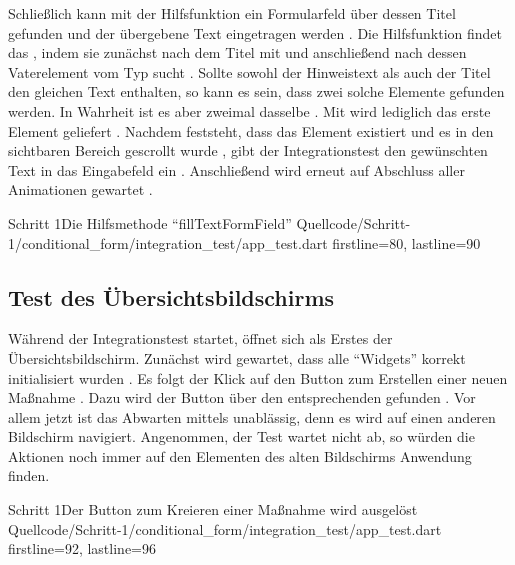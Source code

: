 Schließlich kann mit der Hilfsfunktion  ein Formularfeld über dessen Titel gefunden und der übergebene Text eingetragen werden \Lst{\ref{lst:Schritt1HilfsmethodeFillTextFormField}}.
Die Hilfsfunktion findet das ,
indem sie zunächst nach dem Titel mit  und anschließend nach dessen Vaterelement vom Typ  sucht .
Sollte sowohl der Hinweistext als auch der Titel den gleichen Text enthalten,
so kann es sein, dass zwei solche Elemente gefunden werden.
In Wahrheit ist es aber zweimal dasselbe .
Mit  wird lediglich das erste Element geliefert .
Nachdem feststeht, dass das Element existiert  und es in den sichtbaren Bereich gescrollt wurde , gibt der Integrationstest den gewünschten Text in das Eingabefeld ein .
Anschließend wird erneut auf Abschluss aller Animationen gewartet .

\begin{alexlisting}{Schritt 1}{Die Hilfsmethode \enquote{fillTextFormField}}
  {Quellcode/Schritt-1/conditional_form/integration_test/app_test.dart}
  {firstline=80, lastline=90}
  \label{lst:Schritt1HilfsmethodeFillTextFormField}
\end{alexlisting}

\subsection{Test des Übersichtsbildschirms}
\label{sec:TestDesUebersichtsbildschirms}

Während der Integrationstest startet, öffnet sich als Erstes der Übersichtsbildschirm.
Zunächst wird gewartet, dass alle \enquote{Widgets} korrekt initialisiert wurden .
Es folgt der Klick auf den Button zum Erstellen einer neuen Maßnahme .
Dazu wird der Button über den entsprechenden  gefunden .
Vor allem jetzt ist das Abwarten mittels   unablässig, denn es wird auf einen anderen Bildschirm navigiert.
Angenommen, der Test wartet nicht ab, so würden die Aktionen noch immer auf den Elementen des alten Bildschirms Anwendung finden. 

\begin{alexlisting}{Schritt 1}{Der Button zum Kreieren einer Maßnahme wird ausgelöst}
  {Quellcode/Schritt-1/conditional_form/integration_test/app_test.dart}
  {firstline=92, lastline=96}
  \label{lst:Schritt1ButtonKreierenMassnahmeAusgeloest}
\end{alexlisting}


